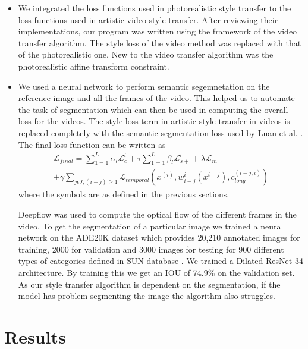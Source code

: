 \documentclass[runningheads]{llncs}
\begin{document}
\begin{itemize}
\item We integrated the loss functions used in photorealistic style transfer  to the loss functions used in artistic video style transfer. After reviewing their implementations, our program was written using the framework of the video transfer algorithm. The style loss of the video method was replaced with that of the photorealistic one. New to the video transfer algorithm was the photorealistic affine transform constraint.

\item  We used a neural network to perform semantic segemnetation on the reference image and all the frames of the video. This helped us to automate the task of segmentation which can then be used in computing the overall loss for the videos. The style loss term in artistic style transfer in videos is replaced completely with the semantic segmentation loss used by Luan et al. \cite{luan2017deep}. The final loss function can be written as
\begin{equation}
\begin{split}
 \mathcal{L}_{final} = \sum_{1=1}^L\alpha_l \mathcal{L}_c^l + \tau \sum_{1=1}^L\beta_l \mathcal{L}_{s+}^l + \lambda \mathcal{L}_m \\ + \gamma \sum_{j \epsilon J, (i-j) \geq 1} \mathcal{L}_{temporal}(x^{(i)}, w_{i-j}^{i}(x^{i-j}),c_{long}^{(i-j, i)})
\end{split}
\end{equation}
 where the symbols are as defined in the previous sections.

Deepflow \cite{weinzaepfel2013deepflow} was used to compute the optical flow of the different frames in the video. To get the segmentation of a particular image we trained a neural network on the ADE20K dataset \cite{zhou2017scene} which provides 20,210 annotated images for training, 2000 for validation and 3000 images for testing for 900 different types of categories defined in SUN database \cite{xiao2010sun}. We trained a Dilated ResNet-34 architecture. By training this we get an IOU of 74.9\% on the validation set. As our style transfer algorithm is dependent on the segmentation, if the model has problem segmenting the image the algorithm also struggles.
\end{itemize}

\section{Results}
\end{document}
